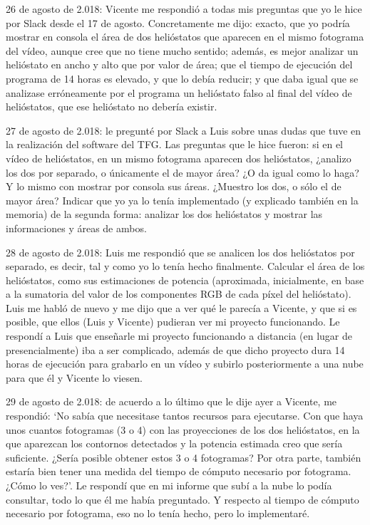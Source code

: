 26 de agosto de 2.018: Vicente me respondió a todas mis preguntas que yo le hice por Slack desde el 17 de agosto. Concretamente me dijo: exacto, que yo podría mostrar en consola el área de dos helióstatos que aparecen en el mismo fotograma del vídeo, aunque cree que no tiene mucho sentido; además, es mejor analizar un helióstato en ancho y alto que por valor de área; que el tiempo de ejecución del programa de 14 horas es elevado, y que lo debía reducir; y que daba igual que se analizase erróneamente por el programa un helióstato falso al final del vídeo de helióstatos, que ese helióstato no debería existir.

27 de agosto de 2.018: le pregunté por Slack a Luis sobre unas dudas que tuve en la realización del software del TFG. Las preguntas que le hice fueron: si en el vídeo de helióstatos, en un mismo fotograma aparecen dos helióstatos, ¿analizo los dos por separado, o únicamente el de mayor área? ¿O da igual como lo haga? Y lo mismo con mostrar por consola sus áreas. ¿Muestro los dos, o sólo el de mayor área? Indicar que yo ya lo tenía implementado (y explicado también en la memoria) de la segunda forma: analizar los dos helióstatos y mostrar las informaciones y áreas de ambos.

28 de agosto de 2.018: Luis me respondió que se analicen los dos helióstatos por separado, es decir, tal y como yo lo tenía hecho finalmente. Calcular el área de los helióstatos, como sus estimaciones de potencia (aproximada, inicialmente, en base a la sumatoria del valor de los componentes RGB de cada píxel del helióstato). Luis me habló de nuevo y me dijo que a ver qué le parecía a Vicente, y que si es posible, que ellos (Luis y Vicente) pudieran ver mi proyecto funcionando. Le respondí a Luis que enseñarle mi proyecto funcionando a distancia (en lugar de presencialmente) iba a ser complicado, además de que dicho proyecto dura 14 horas de ejecución para grabarlo en un vídeo y subirlo posteriormente a una nube para que él y Vicente lo viesen.

29 de agosto de 2.018: de acuerdo a lo último que le dije ayer a Vicente, me respondió: ‘No sabía que necesitase tantos recursos para ejecutarse. Con que haya unos cuantos fotogramas (3 o 4) con las proyecciones de los dos helióstatos, en la que aparezcan los contornos detectados y la potencia estimada creo que sería suficiente. ¿Sería posible obtener estos 3 o 4 fotogramas? Por otra parte, también estaría bien tener una medida del tiempo de cómputo necesario por fotograma. ¿Cómo lo ves?’. Le respondí que en mi informe que subí a la nube lo podía consultar, todo lo que él me había preguntado. Y respecto al tiempo de cómputo necesario por fotograma, eso no lo tenía hecho, pero lo implementaré.


